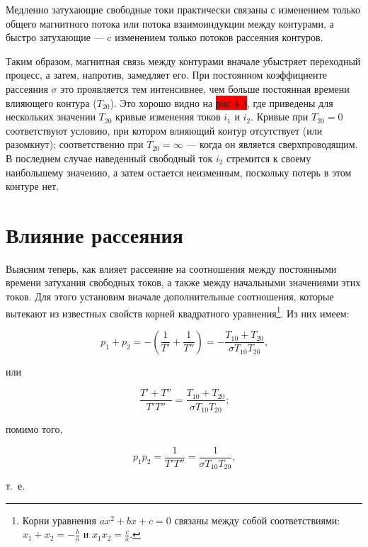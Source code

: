 Медленно затухающие свободные токи практически связаны с изменением только общего магнитного потока или потока взаимоиндукции между контурами, а быстро затухающие — c изменением только потоков рассеяния контуров.

Таким образом, магнитная связь между контурами вначале убыстряет переходный процесс, а затем, напротив, замедляет его. При постоянном коэффициенте рассеяния $ \sigma $ это проявляется тем интенсивнее, чем больше постоянная времени влияющего контура ($ T_{20} $). Это хорошо видно на \colorbox{red}{рис 4-3}, где приведены для нескольких значении $ T_{20} $ кривые изменения токов $ i_1 $ и $ i_2 $. Кривые при $ T_{20} = 0 $ соответствуют условию, при котором влияющий контур отсутствует (или разомкнут); соответственно при $ T_{20}=\infty $ — когда он является сверхпроводящим. В последнем случае наведенный свободный ток $ i_2 $ стремится к своему наибольшему значению, а затем остается неизменным, поскольку потерь в этом контуре нет.

\section{Влияние рассеяния}
\label{sec:4-3}

Выясним теперь, как влияет рассеяние на соотношения между постоянными времени затухания свободных токов, а также между начальными значениями этих токов. Для этого установим вначале дополнительные соотношения, которые вытекают из известных свойств корней квадратного уравнения\footnote{Корни уравнения $ ax^2 + bx + c = 0 $ связаны между собой соответствиями: $ x_1 + x_2 = -\frac{b}{a} $ и $ x_1 x_2 = \frac{c}{a} $.}. Из них имеем:

\begin{equation}
    \label{eq:4-21 p1p2}
    p_1+p_2=-(\frac{1}{T'}+\frac{1}{T''})=-\frac{T_{10}+T_{20}}{\sigma T_{10}T_{20}}\text{,}
\end{equation}

или

\begin{equation*}
    \frac{T'+T''}{T'T''}=\frac{T_{10}+T_{20}}{\sigma T_{10}T_{20}}\text{;}
\end{equation*}

помимо того,

\begin{equation*}
    p_1p_2=\frac{1}{T'T''}=\frac{1}{\sigma T_{10}T_{20}}\text{,}
\end{equation*}

т.~е.

